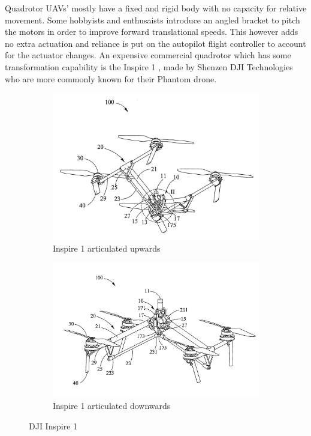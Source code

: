 \par
Quadrotor UAVs' mostly have a fixed and rigid body with no capacity for relative movement. Some hobbyists and enthusaists introduce an angled bracket to pitch the motors in order to improve forward translational speeds. This however adds no extra actuation and reliance is put on the autopilot flight controller to account for the actuator changes. An expensive commercial quadrotor which has some transformation capability is the Inspire 1 \cite{inspire}, made by Shenzen DJI Technologies who are more commonly known for their Phantom drone.
\par
\begin{figure}[htbp]
\centering
\begin{subfigure}{.5\textwidth}
\centering
\includegraphics[width=\textwidth]{figs/dji-inspire1}
\caption{Inspire 1 articulated upwards}
\label{fig:inspireup}
\end{subfigure}%
\begin{subfigure}{.5\textwidth}
\centering
\includegraphics[width=\textwidth]{figs/dji-inspire2}
\caption{Inspire 1 articulated downwards}
\label{fig:inspiredown}
\end{subfigure}
\caption{DJI Inspire 1}
\label{fig:inspire1}
\end{figure}
